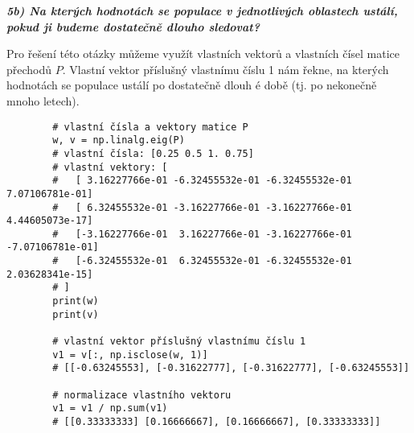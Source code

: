 \documentclass[10pt, a4paper]{ReportSheet}
\begin{document}

    \vspace{5em}

    \textbf{\textit{5b) Na kterých hodnotách se populace v jednotlivých oblastech ustálí, pokud ji budeme dostatečně
    dlouho sledovat?}}

    Pro řešení této otázky můžeme využít vlastních vektorů a vlastních čísel matice přechodů $P$.
    Vlastní vektor příslušný vlastnímu číslu 1 nám řekne, na kterých hodnotách se populace ustálí po dostatečně dlouh
    é době (tj. po nekonečně mnoho letech).
    \begin{verbatim}
        # vlastní čísla a vektory matice P
        w, v = np.linalg.eig(P)
        # vlastní čísla: [0.25 0.5 1. 0.75]
        # vlastní vektory: [
        #   [ 3.16227766e-01 -6.32455532e-01 -6.32455532e-01  7.07106781e-01]
        #   [ 6.32455532e-01 -3.16227766e-01 -3.16227766e-01  4.44605073e-17]
        #   [-3.16227766e-01  3.16227766e-01 -3.16227766e-01 -7.07106781e-01]
        #   [-6.32455532e-01  6.32455532e-01 -6.32455532e-01  2.03628341e-15]
        # ]
        print(w)
        print(v)

        # vlastní vektor příslušný vlastnímu číslu 1
        v1 = v[:, np.isclose(w, 1)]
        # [[-0.63245553], [-0.31622777], [-0.31622777], [-0.63245553]]

        # normalizace vlastního vektoru
        v1 = v1 / np.sum(v1)
        # [[0.33333333] [0.16666667], [0.16666667], [0.33333333]]
    \end{verbatim}

    \newpage
\end{document}
